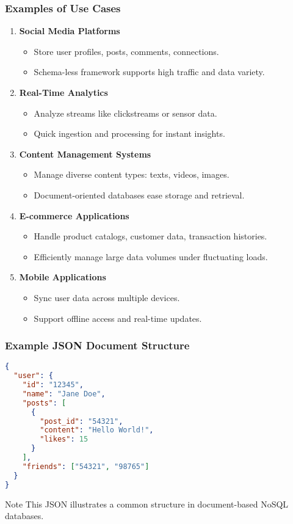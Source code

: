 \documentclass[aspectratio=169]{beamer}
\begin{document}
\begin{frame}[fragile]
    \frametitle{Examples of Use Cases}
    \begin{enumerate}
        \item \textbf{Social Media Platforms}
            \begin{itemize}
                \item Store user profiles, posts, comments, connections.
                \item Schema-less framework supports high traffic and data variety.
            \end{itemize}
        \item \textbf{Real-Time Analytics}
            \begin{itemize}
                \item Analyze streams like clickstreams or sensor data.
                \item Quick ingestion and processing for instant insights.
            \end{itemize}
        \item \textbf{Content Management Systems}
            \begin{itemize}
                \item Manage diverse content types: texts, videos, images.
                \item Document-oriented databases ease storage and retrieval.
            \end{itemize}
        \item \textbf{E-commerce Applications}
            \begin{itemize}
                \item Handle product catalogs, customer data, transaction histories.
                \item Efficiently manage large data volumes under fluctuating loads.
            \end{itemize}
        \item \textbf{Mobile Applications}
            \begin{itemize}
                \item Sync user data across multiple devices.
                \item Support offline access and real-time updates.
            \end{itemize}
    \end{enumerate}
\end{frame}

\begin{frame}[fragile]
    \frametitle{Example JSON Document Structure}
    \begin{lstlisting}[language=json]
{
  "user": {
    "id": "12345",
    "name": "Jane Doe",
    "posts": [
      {
        "post_id": "54321",
        "content": "Hello World!",
        "likes": 15
      }
    ],
    "friends": ["54321", "98765"]
  }
}
    \end{lstlisting}
    \begin{block}{Note}
        This JSON illustrates a common structure in document-based NoSQL databases.
    \end{block}
\end{frame}
\end{document}
